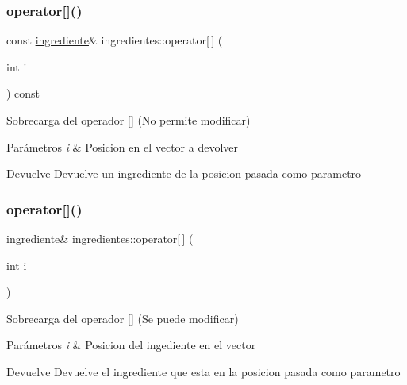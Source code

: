 \subsubsection{\texorpdfstring{operator[]()}{operator[]()}\hspace{0.1cm}{\footnotesize\ttfamily [1/2]}}
{\footnotesize\ttfamily const \hyperlink{classingrediente}{ingrediente}\& ingredientes\+::operator\mbox{[}$\,$\mbox{]} (\begin{DoxyParamCaption}\item[{int}]{i }\end{DoxyParamCaption}) const}



Sobrecarga del operador \mbox{[}\mbox{]} (No permite modificar) 


\begin{DoxyParams}{Parámetros}
{\em i} & Posicion en el vector a devolver \\
\hline
\end{DoxyParams}
\begin{DoxyReturn}{Devuelve}
Devuelve un ingrediente de la posicion pasada como parametro 
\end{DoxyReturn}
\mbox{\label{classingredientes_a9e099786f83d0ac3cf38317b194691db}} 
\subsubsection{\texorpdfstring{operator[]()}{operator[]()}\hspace{0.1cm}{\footnotesize\ttfamily [2/2]}}
{\footnotesize\ttfamily \hyperlink{classingrediente}{ingrediente}\& ingredientes\+::operator\mbox{[}$\,$\mbox{]} (\begin{DoxyParamCaption}\item[{int}]{i }\end{DoxyParamCaption})}



Sobrecarga del operador \mbox{[}\mbox{]} (Se puede modificar) 


\begin{DoxyParams}{Parámetros}
{\em i} & Posicion del ingediente en el vector \\
\hline
\end{DoxyParams}
\begin{DoxyReturn}{Devuelve}
Devuelve el ingrediente que esta en la posicion pasada como parametro 
\end{DoxyReturn}
\mbox{\label{classingredientes_aaf628d0360800484ae277fbb7aa2f81d}} 
